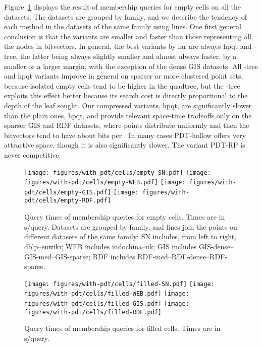 \documentclass{elsarticle}
\newcommand{\kt}{-tree\xspace}
\newcommand{\ktdac}{-tree\xspace}
\newcommand{\dblp}{\textsf{dblp}\xspace}
\newcommand{\enwiki}{\textsf{enwiki}\xspace}
\newcommand{\indo}{\textsf{indochina}\xspace}
\newcommand{\uk}{\textsf{uk}\xspace}
\newcommand{\giss}{\textsf{GIS-sparse}\xspace}
\newcommand{\gism}{\textsf{GIS-med}\xspace}
\newcommand{\gisd}{\textsf{GIS-dense}\xspace}
\newcommand{\rdfs}{\textsf{RDF-sparse}\xspace}
\newcommand{\rdfm}{\textsf{RDF-med}\xspace}
\newcommand{\rdfd}{\textsf{RDF-dense}\xspace}
\newcommand{\hpqt}{\textsf{hpqt}\xspace}
\newcommand{\hpqtp}{\textsf{hpqt}\xspace}
\newcommand{\hpqtR}{\textsf{hpqt}\xspace}
\newcommand{\hpqtpdac}{\textsf{hpqt}\xspace}
\newcommand{\pdth}{PDT-hollow\xspace}
\newcommand{\pdtrp}{PDT-RP\xspace}
\begin{document}
Figure~\ref{fig:timesempty} displays the result of membership queries for empty cells on all the datasets. The datasets are grouped by family, and we describe the tendency of each method in the datasets of the same family using lines. One first general conclusion is that the  variants are smaller and faster than those representing all the nodes in bitvectors. In general, the best variants by far are always \hpqtpdac and \ktdac, the latter being always slightly smaller and almost always faster, by a smaller or a larger margin, with the exception of the dense GIS datasets. All \kt and \hpqt variants improve in general on sparser or more clustered point sets,  because isolated empty cells tend to be higher in the quadtree, but the \kt exploits this effect better because its search cost is directly proportional to the depth of the leaf sought. Our compressed variants, \hpqtR, are significantly slower than the plain ones, \hpqtp, and provide relevant space-time tradeoffs only on the sparser GIS and RDF datasets, where points distribute uniformly and then the  bitvectors tend to have about  bits per . In many cases \pdth offers very attractive space, though it is also significantly slower. The variant \pdtrp is never competitive.



\begin{figure}[t]
\begin{center}
\texttt{[image: figures/with-pdt/cells/empty-SN.pdf]}
\texttt{[image: figures/with-pdt/cells/empty-WEB.pdf]}
\texttt{[image: figures/with-pdt/cells/empty-GIS.pdf]}
\texttt{[image: figures/with-pdt/cells/empty-RDF.pdf]}
\end{center}
\caption{Query times of membership queries for empty cells. Times are in s/query. Datasets are grouped by family, and lines join the points on different datasets of the same family: SN includes, from left to right, \dblp--\enwiki; WEB includes \indo--\uk; GIS includes \gisd--\gism--\giss; RDF includes \rdfm--\rdfd--\rdfs.}
\label{fig:timesempty}
\end{figure}

\begin{figure}[t]
\begin{center}
\texttt{[image: figures/with-pdt/cells/filled-SN.pdf]}
\texttt{[image: figures/with-pdt/cells/filled-WEB.pdf]}
\texttt{[image: figures/with-pdt/cells/filled-GIS.pdf]}
\texttt{[image: figures/with-pdt/cells/filled-RDF.pdf]}
\end{center}
\caption{Query times of membership queries for filled cells. Times are in s/query.}
\label{fig:timesfilled}
\end{figure}
\end{document}
